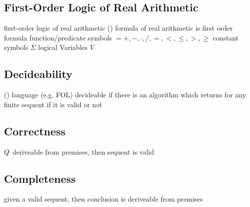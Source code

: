         \subsection{First-Order Logic of Real Arithmetic}
            \label{sec:FOL-R}

            first-order logic of real arithmetic (\FOLR)
            formula of real arithmetic
            is first order formula
            function/predicate symbols $ = {+,-,\cdot,/,=,<,\leq,>,\geq}$
            constant symbols $\Sigma$
            logical Variables $V$

        \subsection{Decideability}
            \label{sec:decideability}

            (\cite{hodges2001ClassicalLogic})
            language (e.g. FOL) decideable if there is an algorithm which returns for any finite sequent if it is valid or not

        \subsection{Correctness}
            \label{sec:correctness}

            $Q$ deriveable from premises, then sequent is valid

        \subsection{Completeness}
            \label{sec:completeness}

            given a valid sequent, then conclusion is deriveable from premises

